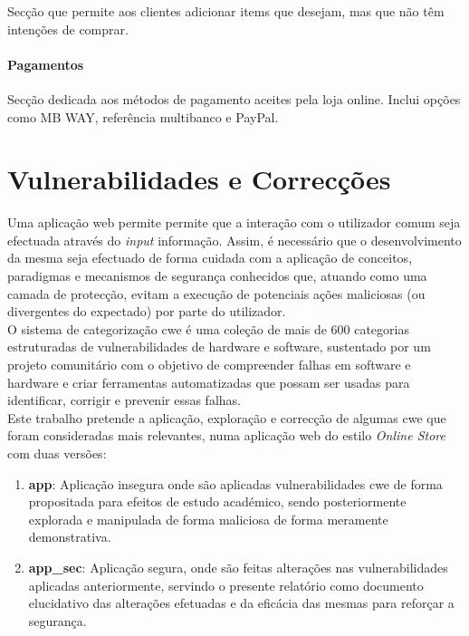 Secção que permite aos clientes adicionar items que desejam, mas que não têm intenções de comprar.

\subsubsection{Pagamentos}

Secção dedicada aos métodos de pagamento aceites pela loja online. Inclui opções como MB WAY, referência multibanco e PayPal.

%
%
\chapter{Vulnerabilidades e Correcções}
\label{chap.vulnerabilidades}
Uma aplicação web permite permite que a interação com o utilizador comum seja efectuada através do \textit{input} informação. Assim, é necessário que o desenvolvimento da mesma seja efectuado de forma cuidada com a aplicação de conceitos, paradigmas e mecanismos de segurança conhecidos que, atuando como uma camada de protecção, evitam a execução de potenciais ações maliciosas (ou divergentes do expectado) por parte do utilizador. \\

O sistema de categorização \acf{cwe} é uma coleção de mais de 600 categorias estruturadas de vulnerabilidades de hardware e software, sustentado por um projeto comunitário com o objetivo de compreender falhas em software e hardware e criar ferramentas automatizadas que possam ser usadas para identificar, corrigir e prevenir essas falhas. \\

Este trabalho pretende a aplicação, exploração e correcção de algumas \ac{cwe} que foram consideradas mais relevantes, numa aplicação web do estilo \textit{Online Store} com duas versões:

\begin{enumerate}
	\item \textbf{app}: Aplicação insegura onde são aplicadas vulnerabilidades \ac{cwe} de forma propositada para efeitos de estudo académico, sendo posteriormente explorada e manipulada de forma maliciosa de forma meramente demonstrativa. 
	\item \textbf{app\_sec}: Aplicação segura, onde são feitas alterações nas vulnerabilidades aplicadas anteriormente, servindo o presente relatório como documento elucidativo das alterações efetuadas e da eficácia das mesmas para reforçar a segurança. 
\end{enumerate}

